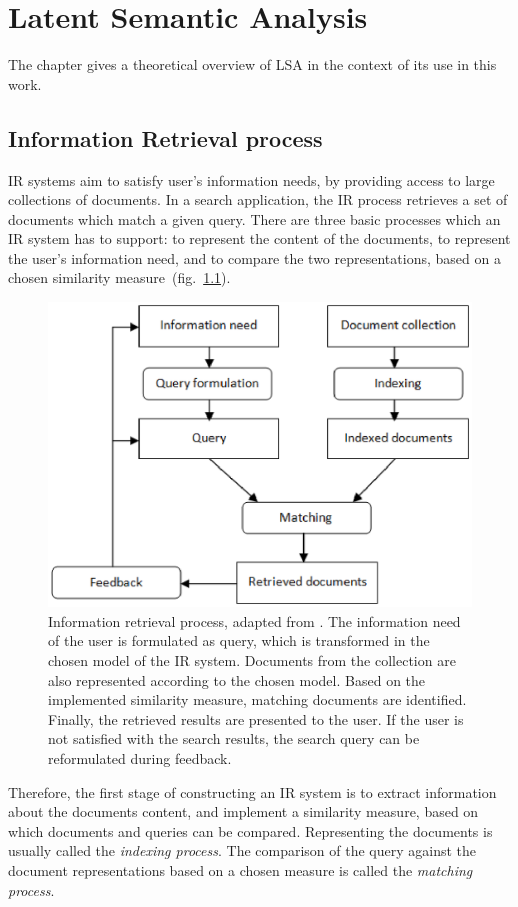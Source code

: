 \chapter{Latent Semantic Analysis}
\label{sec:lsa}

\begin{summary}
The chapter gives a theoretical overview of \gls{LSA} in the context of its use in this work.
\end{summary}
 
\section{Information Retrieval process}
\gls{IR} systems aim to satisfy user's information needs, by providing access to large collections of documents.  In a search application, the \gls{IR} process retrieves a set of documents which match a given query. There are three basic processes which an \gls{IR} system has to support: to represent the content of the documents, to represent the user's information need, and to compare the two representations, based on a chosen similarity measure~(fig.~\ref{lsa:fig:ir_process}).
%
%
\begin{figure}[htbp]
	\centering
	\includegraphics[scale=0.7]{img/IR} 
	\caption[Information Retrieval process]%
           {Information retrieval process, adapted from \cite{IRmodels09}. The information need of the user is formulated as query, which is transformed in the chosen model of the \gls{IR} system. Documents from the collection are also represented according to the chosen model. Based on the implemented similarity measure, matching documents are identified. Finally, the retrieved results are presented to the user. If the user is not satisfied with the search results, the search query can be reformulated during feedback.}
\label{lsa:fig:ir_process}
\end{figure} 
Therefore, the first stage of constructing an \gls{IR} system is to extract information about the documents content, and implement a similarity measure, based on which documents and queries can be compared. Representing the documents is usually called the \textit{indexing process}. The comparison of the query against the document representations based on a chosen measure is called the \textit{matching process}.\\

